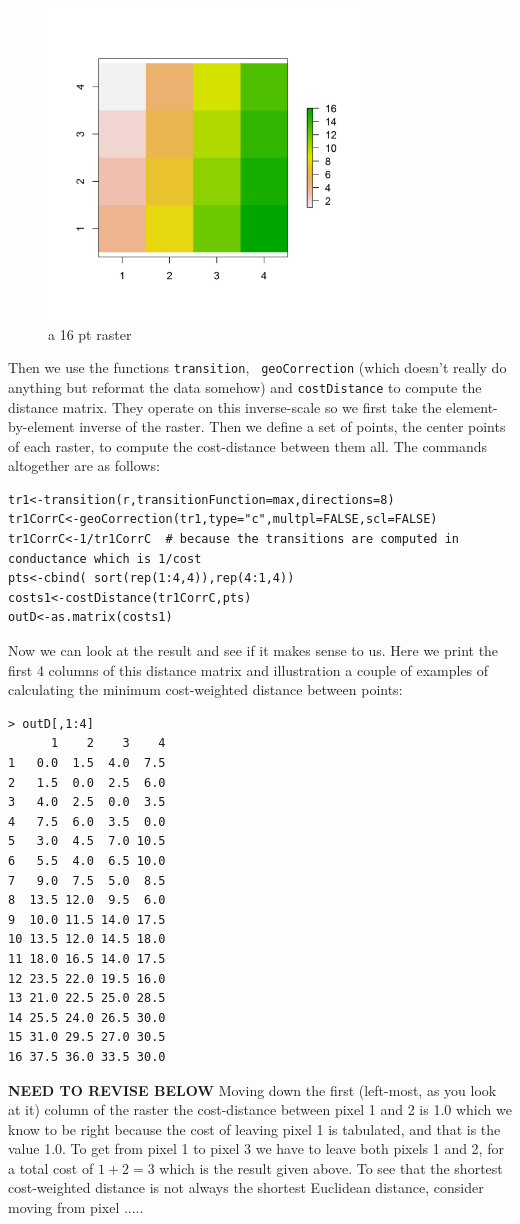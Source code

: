 \begin{figure}
\begin{center}
\includegraphics[height=3.25in,width=3.25in]{Ch10/figs/raster}
\end{center}
\caption{a 16 pt raster}
\label{ecoldist.fig.raster}
\end{figure}

Then we use the functions \mbox{\tt transition}, \mbox{\tt
  geoCorrection} (which doesn't really do anything but reformat the
data somehow) and \mbox{\tt costDistance} to compute the distance
matrix. They operate on this inverse-scale so we first take the 
element-by-element inverse of the raster. Then we define a set of points,
the center points of each raster, to compute the cost-distance between
them all. The commands altogether are as follows:
\begin{verbatim}
tr1<-transition(r,transitionFunction=max,directions=8)
tr1CorrC<-geoCorrection(tr1,type="c",multpl=FALSE,scl=FALSE)
tr1CorrC<-1/tr1CorrC  # because the transitions are computed in conductance which is 1/cost
pts<-cbind( sort(rep(1:4,4)),rep(4:1,4))
costs1<-costDistance(tr1CorrC,pts)
outD<-as.matrix(costs1)
\end{verbatim}
Now we can look at the result and see if it makes sense to us. Here we
print the first 4 columns of this distance matrix and illustration a
couple of examples of calculating the minimum cost-weighted distance
between points:
\small{
\begin{verbatim}
> outD[,1:4]
      1    2    3    4
1   0.0  1.5  4.0  7.5
2   1.5  0.0  2.5  6.0
3   4.0  2.5  0.0  3.5
4   7.5  6.0  3.5  0.0
5   3.0  4.5  7.0 10.5
6   5.5  4.0  6.5 10.0
7   9.0  7.5  5.0  8.5
8  13.5 12.0  9.5  6.0
9  10.0 11.5 14.0 17.5
10 13.5 12.0 14.5 18.0
11 18.0 16.5 14.0 17.5
12 23.5 22.0 19.5 16.0
13 21.0 22.5 25.0 28.5
14 25.5 24.0 26.5 30.0
15 31.0 29.5 27.0 30.5
16 37.5 36.0 33.5 30.0
\end{verbatim}
}
{\bf NEED TO REVISE BELOW}
Moving down the first (left-most, as you look at it) column of the
raster the cost-distance between pixel 1 and 2 is 1.0 which we know to
be right because the cost of leaving pixel 1 is tabulated, and that is
the value 1.0.  To get from pixel 1 to pixel 3 we have to leave both
pixels 1 and 2, for a total cost of $1+2 = 3$ which is the result
given above.  To see that the shortest cost-weighted distance is not always the
shortest Euclidean distance, consider moving from pixel .....



